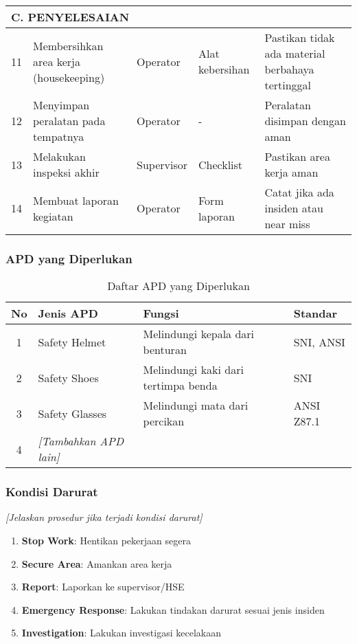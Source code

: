\begin{landscape}
\begin{longtable}{|c|p{5cm}|p{3cm}|p{4cm}|p{4cm}|}
\multicolumn{5}{|l|}{\textbf{C. PENYELESAIAN}} \\
\hline
11 & Membersihkan area kerja (housekeeping) & Operator & Alat kebersihan & Pastikan tidak ada material berbahaya tertinggal \\
\hline
12 & Menyimpan peralatan pada tempatnya & Operator & - & Peralatan disimpan dengan aman \\
\hline
13 & Melakukan inspeksi akhir & Supervisor & Checklist & Pastikan area kerja aman \\
\hline
14 & Membuat laporan kegiatan & Operator & Form laporan & Catat jika ada insiden atau near miss \\
\hline

\end{longtable}
\end{landscape}

\vspace{0.5cm}

\subsubsection{APD yang Diperlukan}

\begin{table}[h]
\centering
\begin{tabular}{|c|p{4cm}|p{6cm}|p{3cm}|}
\hline
\textbf{No} & \textbf{Jenis APD} & \textbf{Fungsi} & \textbf{Standar} \\
\hline
1 & Safety Helmet & Melindungi kepala dari benturan & SNI, ANSI \\
\hline
2 & Safety Shoes & Melindungi kaki dari tertimpa benda & SNI \\
\hline
3 & Safety Glasses & Melindungi mata dari percikan & ANSI Z87.1 \\
\hline
4 & \textit{[Tambahkan APD lain]} & & \\
\hline
\end{tabular}
\caption{Daftar APD yang Diperlukan}
\label{tab:apd-sop}
\end{table}

\vspace{0.5cm}

\subsubsection{Kondisi Darurat}

\textit{[Jelaskan prosedur jika terjadi kondisi darurat]}

\begin{enumerate}
    \item \textbf{Stop Work}: Hentikan pekerjaan segera
    \item \textbf{Secure Area}: Amankan area kerja
    \item \textbf{Report}: Laporkan ke supervisor/HSE
    \item \textbf{Emergency Response}: Lakukan tindakan darurat sesuai jenis insiden
    \item \textbf{Investigation}: Lakukan investigasi kecelakaan
\end{enumerate}

